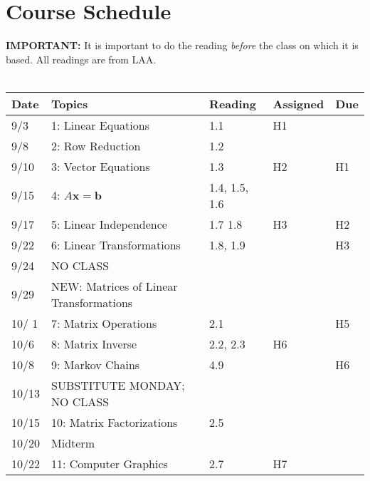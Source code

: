 \documentclass[11pt]{article}
\begin{document}
\newpage
\section*{Course Schedule}

\textbf{IMPORTANT:} It is important to do the reading \emph{before} the class on
which it is based.   All readings are from LAA.
\\~\\
\small
\begin{centering}
\begin{tabular}{||l|p{3in}|l|l|l||}
\hline\hline
Date & Topics  & Reading & Assigned & Due  \\
\hline\hline
9/3 & 1: Linear Equations & 1.1 & H1  & \\
\hline

9/8 &  2: Row Reduction & 1.2  &  & \\
9/10 & 3: Vector Equations & 1.3 & H2 & H1 \\
\hline

9/15 & 4: $A\mathbf{x} =\mathbf{b}$  & 1.4, 1.5, 1.6 &  & \\
9/17 & 5: Linear Independence & 1.7 1.8 & H3 & H2 \\ %
\hline

9/22 & 6: Linear Transformations  & 1.8, 1.9 & & H3 \\
9/24 & NO CLASS & &&\\
\hline

9/29 &  NEW: Matrices of Linear Transformations &  & & \\
10/ 1 &7: Matrix Operations  & 2.1 & & H5\\ 
\hline

10/6 & 8: Matrix Inverse & 2.2, 2.3 & H6 &\\ 
10/8 & 9: Markov Chains & 4.9 & & H6 \\  
\hline

% 
10/13 & SUBSTITUTE MONDAY; NO CLASS &&&\\
10/15 & 10: Matrix Factorizations & 2.5 & & \\ %
\hline

10/20 & Midterm & & &\\
10/22 & 11: Computer Graphics & 2.7 & H7 &\\ 
\hline


\end{tabular}
\end{centering}
\end{document}
